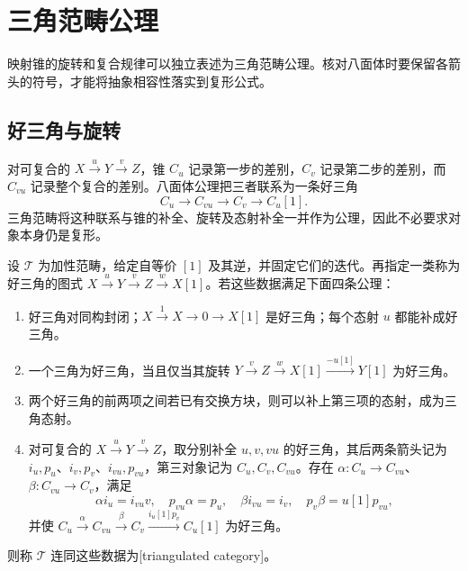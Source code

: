 
\section{三角范畴公理}
\label{b4:sec:1602}

映射锥的旋转和复合规律可以独立表述为三角范畴公理。核对八面体时要保留各箭头的符号，才能将抽象相容性落实到复形公式。


%
%

\subsection{好三角与旋转}
\label{b4:subsec:1602:01}

对可复合的 \(X\xrightarrow{u}Y\xrightarrow{v}Z\)，锥 \(C_u\) 记录第一步的差别，\(C_v\) 记录第二步的差别，而 \(C_{vu}\) 记录整个复合的差别。八面体公理把三者联系为一条好三角
\[
	C_u\longrightarrow C_{vu}\longrightarrow C_v\longrightarrow C_u[1].
\]
三角范畴将这种联系与锥的补全、旋转及态射补全一并作为公理，因此不必要求对象本身仍是复形。

\begin{definition}\label{b4:def:triangulated-category}
	设 \(\mathcal T\) 为加性范畴，给定自等价 \([1]\) 及其逆，并固定它们的迭代。再指定一类称为好三角的图式 \(X\xrightarrow{u}Y\xrightarrow{v}Z\xrightarrow{w}X[1]\)。若这些数据满足下面四条公理：
	\begin{enumerate}
		\item[(TR1)] 好三角对同构封闭；\(X\xrightarrow{1}X\to0\to X[1]\) 是好三角；每个态射 \(u\) 都能补成好三角。
		\item[(TR2)] 一个三角为好三角，当且仅当其旋转 \(Y\xrightarrow{v}Z\xrightarrow{w}X[1]\xrightarrow{-u[1]}Y[1]\) 为好三角。
		\item[(TR3)] 两个好三角的前两项之间若已有交换方块，则可以补上第三项的态射，成为三角态射。
		\item[(TR4)] 对可复合的 \(X\xrightarrow{u}Y\xrightarrow{v}Z\)，取分别补全 \(u,v,vu\) 的好三角，其后两条箭头记为 \(i_u,p_u\)、\(i_v,p_v\)、\(i_{vu},p_{vu}\)，第三对象记为 \(C_u,C_v,C_{vu}\)。存在 \(\alpha:C_u\to C_{vu}\)、\(\beta:C_{vu}\to C_v\)，满足
			\[
				\alpha i_u=i_{vu}v,\quad p_{vu}\alpha=p_u,\quad \beta i_{vu}=i_v,\quad p_v\beta=u[1]p_{vu},
			\]
			并使 \(C_u\xrightarrow{\alpha}C_{vu}\xrightarrow{\beta}C_v\xrightarrow{i_u[1]p_v}C_u[1]\) 为好三角。
	\end{enumerate}
	则称 \(\mathcal T\) 连同这些数据为[triangulated category]。
\end{definition}

